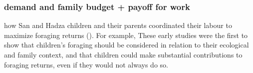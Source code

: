 \subsubsection{demand and family budget + payoff for work}
how San and Hadza children and their parents coordinated their labour to maximize foraging returns (\cite{hawkes_hadza_1995}). For example,  These early studies were the first to show that children’s foraging should be considered in relation to their ecological and family context, and that children could make substantial contributions to foraging returns, even if they would not always do so.

\cite{bird_constraints_2002}
\cite{blurton_jones_modelling_1989}
\cite{bock_evolutionary_2002}
\cite{bird_constraints_2002}
 



